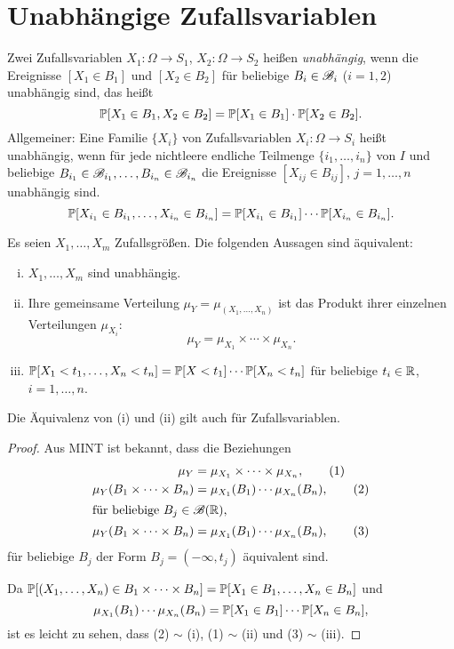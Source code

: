 \section{Unabhängige Zufallsvariablen}
\begin{defn}
  Zwei Zufallsvariablen $X_1 : \Omega \to S_1$, $X_2: \Omega \to S_2$ heißen
  \emph{unabhängig}, wenn die Ereignisse $[X_1 \in B_1]$ und $[X_2 \in B_2]$ für
  beliebige $B_i \in \mathscr{B}_i$ ($i=1,2$) unabhängig sind, das heißt
  \[ \mathbb{P}[ X_1 \in B_1, X_2 \in B_2] = \mathbb{P}[ X_1 \in B_1] \cdot \mathbb{P}[X_2 \in
    B_2]. \]
  Allgemeiner: Eine Familie $\{X_i\}$ von Zufallsvariablen $X_i : \Omega \to
  S_i$ heißt unabhängig, wenn für jede nichtleere endliche Teilmenge $\{i_1,
  \ldots, i_n\}$ von $I$ und beliebige $B_{i_1} \in \mathscr{B}_{i_1}, \ldots,
  B_{i_n} \in \mathscr{B}_{i_n}$ die Ereignisse $[X_{ij} \in B_{ij}]$, $j  = 1,
  \ldots, n$ unabhängig sind.
  \[ \mathbb{P}[ X_{i_1} \in B_{i_1}, \ldots, X_{i_n} \in B_{i_n}] = \mathbb{P}[ X_{i_1} \in B_{i_1}]
    \cdots \mathbb{P}[X_{i_n} \in B_{i_n}]. \]
\end{defn}

\begin{thm}
  Es seien $X_1, \ldots, X_m$ Zufallsgrößen. Die folgenden Aussagen sind
  äquivalent:
  \begin{enumerate}[(i)]
  \item $X_1, \ldots, X_m$ sind unabhängig.
  \item Ihre gemeinsame Verteilung $\mu_Y = \mu_{(X_1, \ldots, X_n)}$ ist das
    Produkt ihrer einzelnen Verteilungen $\mu_{X_i}$:
    \[ \mu_Y = \mu_{X_1} \times \cdots \times \mu_{X_n}. \]
  \item $\mathbb{P}[X_1 < t_1, \ldots, X_n < t_n] = \mathbb{P}[X < t_1] \cdots \mathbb{P}[X_n < t_n]$
    für beliebige $t_i \in \mathbb{R}$, $i = 1, \ldots, n$.
  \end{enumerate}
  Die Äquivalenz von (i) und (ii) gilt auch für Zufallsvariablen.
\end{thm}

\begin{proof}
  Aus MINT ist bekannt, dass die Beziehungen
  \begin{align*}
    \mu_Y
    &= \mu_{X_1} \times \cdots \times \mu_{X_n},
      \tag{1} \\
    \mu_Y( B_1 \times \cdots \times B_n)
    &= \mu_{X_1}(B_1) \cdots \mu_{X_n}(B_n),
      \tag{2} \\
    \intertext{für beliebige $B_j \in \mathscr{B}(\mathbb{R})$,}
    \mu_Y( B_1 \times \cdots \times B_n)
    &= \mu_{X_1}(B_1) \cdots \mu_{X_n}(B_n),
      \tag{3}
  \end{align*}
  für beliebige $B_j$ der Form $B_j = (-\infty, t_j)$ äquivalent sind.
  
  Da $\mathbb{P}[ (X_1, \ldots, X_n) \in B_1 \times \cdots \times B_n] = \mathbb{P}[X_1 \in
  B_1, \ldots, X_n \in B_n]$ und
  \[ \mu_{X_1}(B_1) \cdots \mu_{X_n}(B_n) = \mathbb{P}[X_1 \in B_1] \cdots \mathbb{P}[X_n \in
    B_n], \]
  ist es leicht zu sehen, dass (2) $\sim$ (i), (1) $\sim$ (ii) und (3) $\sim$
  (iii).
\end{proof}

